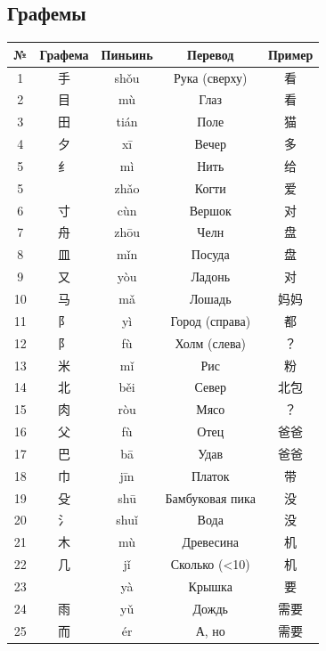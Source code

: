 \subsection{Графемы}
\begin{center}
	\LARGE
	\begin{longtable}{||c c c c c||} 
		\hline
		№ & Графема & Пиньинь & Перевод & Пример \\ [1ex] 
		\hline
		\endhead
		\hline
		1 & 手 & shǒu & Рука (сверху) & 看 \\ 
		\hline
		2 & 目 & mù & Глаз & 看 \\
		\hline
		3 & 田 & tián & Поле & 猫 \\
		\hline
		4 & 夕 & xī & Вечер & 多 \\ 
		\hline
		5 & 纟 & mì & Нить & 给 \\ 
		\hline
		5 &  & zhǎo & Когти & 爱 \\ 
		\hline
		6 & 寸 & cùn & Вершок & 对 \\ 
		\hline
		7 & 舟 & zhōu & Челн & 盘 \\ 
		\hline
		8 & 皿 & mǐn & Посуда & 盘 \\ 
		\hline
		9 & 又 & yòu & Ладонь & 对 \\ 
		\hline
		10 & 马 & mǎ & Лошадь & 妈妈 \\ 
		\hline
		11 & 阝 & yì & Город (справа) & 都 \\ 
		\hline
		12 & 阝 & fù & Холм (слева) & ？ \\ 
		\hline
		13 & 米 & mǐ & Рис & 粉 \\ 
		\hline
		14 & 北 & běi & Север & 北包 \\ 
		\hline
		15 & 肉 & ròu & Мясо & ？ \\ 
		\hline
		16 & 父 & fù & Отец & 爸爸 \\ 
		\hline
		17 & 巴 & bā & Удав & 爸爸 \\ 
		\hline
		18 & 巾 & jīn & Платок & 带 \\ 
		\hline
		19 & 殳 & shū & Бамбуковая пика & 没 \\ 
		\hline
		20 & 氵 & shuǐ & Вода & 没 \\ 
		\hline
		21 & 木 & mù & Древесина & 机 \\ 
		\hline
		22 & 几 & jǐ & Сколько (<10) & 机 \\ 
		\hline
		23 &  & yà & Крышка & 要 \\ 
		\hline
		24 & 雨 & yǔ & Дождь & 需要 \\ 
		\hline
		25 & 而 & ér & А, но & 需要 \\ 

\end{longtable}
\end{center}
